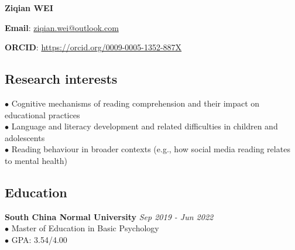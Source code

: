 \documentclass[a4paper, 10pt]{article}
\begin{document}
\centerline{\large{\bf{Ziqian WEI}} }  %
\centerline{\textbf{Email}: \href{mailto: ziqian.wei@outlook.com}{ziqian.wei@outlook.com}}
\centerline{\textbf{ORCID}: \href{https://orcid.org/0009-0005-1352-887X}{https://orcid.org/0009-0005-1352-887X}}

\bigskip

\subsection*{Research interests}

$\bullet$\hspace{1.8em} Cognitive mechanisms of reading comprehension and their impact on educational practices \\
$\bullet$\hspace{1.8em} Language and literacy development and related difficulties in children and adolescents \\
$\bullet$\hspace{1.8em} Reading behaviour in broader contexts (e.g., how social media reading relates to mental health)

\bigskip

\subsection*{Education}

\textbf{South China Normal University} \hfill \textit{Sep 2019 - Jun 2022} \\
$\bullet$\hspace{1.8em} Master of Education in Basic Psychology \\
$\bullet$\hspace{1.8em} GPA: 3.54/4.00 \\
\end{document}
